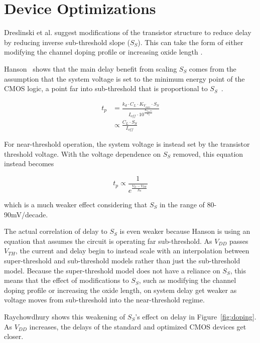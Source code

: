 \section{Device Optimizations}
\label{sec:deviceoptimization}

Dreslinski et al. \cite{Dreslinski:2010ez} suggest modifications of the transistor structure to reduce delay by reducing inverse sub-threshold slope ($S_S$). 
This can take the form of either modifying the channel doping profile \cite{Paul:2004cx} or increasing oxide length \cite{Hanson:2007uu}.

Hanson~\cite{Hanson:2007uu} shows that the main delay benefit from scaling $S_S$ comes from the assumption that the system voltage is set to the minimum energy point of the CMOS logic, a point far into sub-threshold that is proportional to $S_S$~\cite{Hanson:2007uu}. 

\begin{align}
t_p&=\frac{k_d \cdot C_L \cdot K_{V_{min}} \cdot S_S}{I_{off} \cdot 10^\frac{K_{V_{min}S_S}}{S_S}}\\
&\propto \frac{C_L \cdot S_S}{I_{off}}
\end{align}


For near-threshold operation, the system voltage is instead set by the transistor threshold voltage. 
With the voltage dependence on $S_S$ removed, this equation instead becomes

\begin{equation}
t_p \propto \frac{1}{e^\frac{V_{D}-V_{TH}}{S_S}}
\end{equation} 

which is a much weaker effect considering that $S_S$ in the range of 80-90mV/decade. 

The actual correlation of delay to $S_S$ is even weaker because Hanson is using an equation that assumes the circuit is operating far sub-threshold. 
As $V_{DD}$ passes $V_{TH}$, the current and delay begin to instead scale with an interpolation between super-threshold and sub-threshold models rather than just the sub-threshold model. 
Because the super-threshold model does not have a reliance on $S_S$, this means that the effect of modifications to $S_S$, such as modifying the channel doping profile or increasing the oxide length, on system delay get weaker as voltage moves from sub-threshold into the near-threshold regime.

 Raychowdhury \cite{Raychowdhury:2006fu} shows this weakening of $S_S$'s effect on delay in Figure~\ref{fig:doping}. As $V_{DD}$ increases, the delays of the standard and optimized CMOS devices get closer.
  
